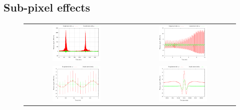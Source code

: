 \documentclass{article}
\begin{document}
\subsection{Sub-pixel effects}
\label{sect:subpix}
\begin{figure}
	\centering
	\begin{tabular}{cc}
		\includegraphics[width=0.48\textwidth,trim=8mm 0 0mm 0mm]{plots/tod000_full.png} &
		\includegraphics[width=0.48\textwidth,trim=8mm 0 0mm 0mm]{plots/tod000_10min.png} \\
		\includegraphics[width=0.48\textwidth,trim=8mm 0 0mm 0mm]{plots/tod000_1min.png} &
		\includegraphics[width=0.48\textwidth,trim=8mm 0 0mm 0mm]{plots/tod000_stroke.png}

\end{tabular}
\end{figure}
\end{document}
